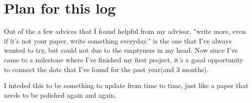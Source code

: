 \section{Plan for this log}
Out of the a few advices that I found helpful from my advisor, "write more, even if it's not your paper, write something everyday." 
is the one that I've always wanted to try, but could not due to the emptyness in my head. 
Now since I've came to a milestone where I've finished my first project, it's a good opportunity to connect the dots that I've found for the past year(and 3 months).

I inteded this to be something to update from time to time, just like a paper that needs to be polished again and again.